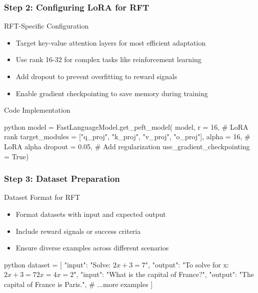 \documentclass[aspectratio=169]{beamer}
\begin{document}
\begin{frame}[fragile]
	\frametitle{Step 2: Configuring LoRA for RFT}
	\begin{block}{RFT-Specific Configuration}
		\begin{itemize}
			\item Target key-value attention layers for most efficient adaptation
			\item Use rank 16-32 for complex tasks like reinforcement learning
			\item Add dropout to prevent overfitting to reward signals
			\item Enable gradient checkpointing to save memory during training
		\end{itemize}
	\end{block}
	\begin{block}{Code Implementation}
		\begin{mintedbox}{python}
model = FastLanguageModel.get_peft_model(
    model,
    r = 16,  # LoRA rank
    target_modules = ["q_proj", "k_proj", "v_proj", "o_proj"],
    alpha = 16,  # LoRA alpha
    dropout = 0.05,  # Add regularization
    use_gradient_checkpointing = True)
		\end{mintedbox}
	\end{block}
\end{frame}

\begin{frame}[fragile]
	\frametitle{Step 3: Dataset Preparation}
	\begin{block}{Dataset Format for RFT}
		\begin{itemize}
			\item Format datasets with input and expected output
			\item Include reward signals or success criteria
			\item Ensure diverse examples across different scenarios
		\end{itemize}
	\end{block}
	\begin{mintedbox}{python}
dataset = [
    {"input": "Solve: $2x + 3 = 7$", 
     "output": "To solve for x:\n$2x + 3 = 7$\n$2x = 4$\n$x = 2$"},
    {"input": "What is the capital of France?", 
     "output": "The capital of France is Paris."},
    # ...more examples
]
	\end{mintedbox}
\end{frame}
\end{document}

